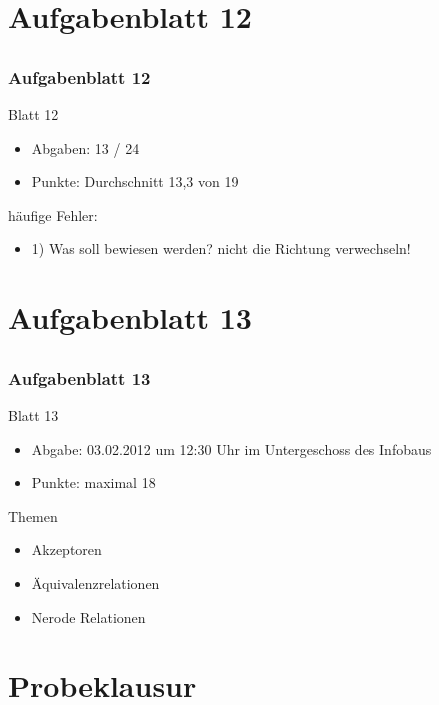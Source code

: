 \section[Rückblick]{Aufgabenblatt 12}
\subsection*{}
\begin{frame}
	\frametitle{Aufgabenblatt 12}
	\begin{block}{Blatt 12}
		\begin{itemize}
			\item Abgaben: 13 / 24
			\item Punkte: Durchschnitt 13,3 von 19
		\end{itemize}
		häufige Fehler:
		\begin{itemize}
			\item 1) Was soll bewiesen werden? nicht die Richtung verwechseln!
		\end{itemize}
   \end{block}
\end{frame}

\section[Blatt 13]{Aufgabenblatt 13}
\subsection*{}
\begin{frame}
	\frametitle{Aufgabenblatt 13}
	\begin{block}{Blatt 13}
		\begin{itemize}
			\item Abgabe: 03.02.2012 um 12:30 Uhr im Untergeschoss des Infobaus
			\item Punkte: maximal 18
		\end{itemize}
  	\end{block}
	\begin{block}{Themen}
		\begin{itemize}
	  		\item Akzeptoren
	  		\item Äquivalenzrelationen
	  		\item Nerode Relationen
	 	\end{itemize}
	\end{block}
\end{frame}

\section{Probeklausur}

